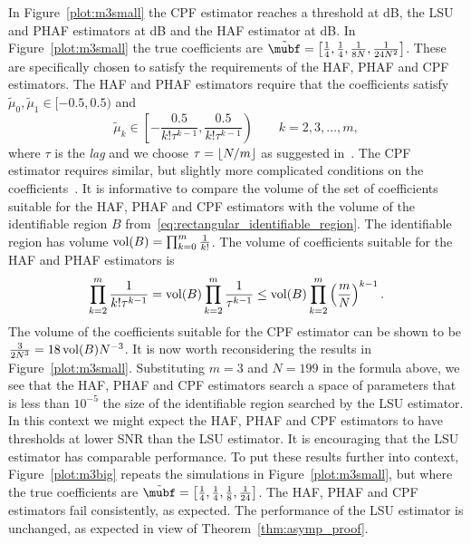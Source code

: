 \documentclass[journal]{IEEEtran}
\begin{document}
In Figure~\ref{plot:m3small} the CPF estimator reaches a threshold at \unit[1]{dB}, the LSU and PHAF estimators at \unit[3]{dB} and the HAF estimator at \unit[5]{dB}.  In Figure~\ref{plot:m3small} the true coefficients are $\tilde{\mubf} = \left[ \tfrac{1}{4}, \tfrac{1}{4}, \tfrac{1}{8N}, \tfrac{1}{24N^2}  \right]$.  These are specifically chosen to satisfy the requirements of the HAF, PHAF and CPF estimators.  The HAF and PHAF estimators require that the coefficients satisfy $\tilde{\mu}_0, \tilde{\mu}_1 \in [-0.5, 0.5)$ and
\[
\tilde{\mu}_k \in \left[ -\frac{0.5}{k! \tau^{k-1}}, \frac{0.5}{k! \tau^{k-1}}\right) \qquad k = 2,3,\dots,m,
\]
where $\tau$ is the \emph{lag} and we choose $\tau = {\left\lfloor N/m \right\rfloor}$ as suggested in~\cite{Peleg_DPT_1995,Barbarossa_PHAF_1998}.  The CPF estimator requires similar, but slightly more complicated conditions on the coefficients~\cite{Oshea_cpf_2004}.  It is informative to compare the volume of the set of coefficients suitable for the HAF, PHAF and CPF estimators with the volume of the identifiable region $B$ from~\eqref{eq:rectangular_identifiable_region}. The identifiable region has volume $\operatorname{vol}(B) = \prod_{k=0}^m {\frac{1}{k!}}$.  The volume of coefficients suitable for the HAF and PHAF estimators is
\[
\prod_{k=2}^m \frac{1}{k! \tau^{k-1}} =  \operatorname{vol}(B) \prod_{k=2}^m \frac{1}{\tau^{k-1}} \leq \operatorname{vol}(B) \prod_{k=2}^m \left( \frac{m}{N} \right)^{k-1}.
\]
The volume of the coefficients suitable for the CPF estimator can be shown to be $\tfrac{3}{2N^3} = 18 \operatorname{vol}(B) N^{-3}$.  It is now worth reconsidering the results in Figure~\ref{plot:m3small}.  Substituting $m=3$ and $N=199$ in the formula above, we see that the HAF, PHAF and CPF estimators search a space of parameters that is less than $10^{-5}$ the size of the identifiable region searched by the LSU estimator.  In this context we might expect the HAF, PHAF and CPF estimators to have thresholds at lower SNR than the LSU estimator.  It is encouraging that the LSU estimator has comparable performance.  To put these results further into context, Figure~\ref{plot:m3big} repeats the simulations in Figure~\ref{plot:m3small}, but where the true coefficients are $\tilde{\mubf} = \left[ \tfrac{1}{4}, \tfrac{1}{4}, \tfrac{1}{8}, \tfrac{1}{24}  \right]$.  The HAF, PHAF and CPF estimators fail consistently, as expected.  The performance of the LSU estimator is unchanged, as expected in view of Theorem~\ref{thm:asymp_proof}.
\end{document}
